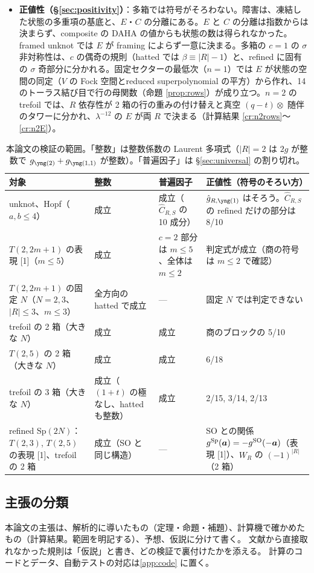 \begin{itemize}
\item \textbf{正値性（§\ref{sec:positivity}）}：多箱では符号がそろわない。障害は、凍結した状態の多重項の基底と、$E$・$C$ の分離にある。$E$ と $C$ の分離は指数からは決まらず、composite の DAHA の値からも状態の数は得られなかった。framed unknot では $E$ が framing によらず一意に決まる。多箱の $c = 1$ の $\sigma$ 非対称性は、$c$ の偶奇の規則（hatted では $\beta \equiv |R| - 1$）と、refined に固有の $\sigma$ 奇部分に分かれる。固定セクターの最低次（$n = 1$）では $E$ が状態の空間の同定（$V$ の Fock 空間とreduced superpolynomial の平方）から作れ、14 のトーラス結び目で行の母関数（命題 \ref{prop:rows}）が成り立つ。$n = 2$ の trefoil では、$R$ 依存性が 2 箱の行の重みの付け替えと真空 $(q-t)\otimes$ 随伴のタワーに分かれ、$\lambda^{-12}$ の $E$ が両 $R$ で決まる（計算結果 \ref{cr:n2rows}〜\ref{cr:n2E}）。
\end{itemize}

\begin{table}[t]
\centering
\small
\caption{本論文の検証の範囲。「整数」は整数係数の Laurent 多項式（$|R| = 2$ は $2g$ が整数で $g_{\ytwo} + g_{\yoneone}$ が整数）。「普遍因子」は §\ref{sec:universal} の割り切れ。}\label{tab:summary}
\begin{tabular}{p{3.6cm}p{2.6cm}p{2.4cm}p{5.4cm}}
\toprule
対象 & 整数 & 普遍因子 & 正値性（符号のそろい方） \\
\midrule
unknot、Hopf（$a, b \le 4$） & 成立 & 成立（$\hat C_{R,S}$ の 10 成分） & $\hat g_{R,\yone}$ はそろう。$\hat C_{R,S}$ の refined だけの部分は 8/10 \\
$T(2,2m+1)$ の表現 [1]（$m \le 5$） & 成立 & $c = 2$ 部分は $m \le 5$、全体は $m \le 2$ & 判定式が成立（商の符号は $m \le 2$ で確認） \\
$T(2,2m+1)$ の固定 $N$（$N = 2, 3$、$|R| \le 3$、$m \le 3$） & 全方向の hatted で成立 & — & 固定 $N$ では判定できない \\
trefoil の 2 箱（大きな $N$） & 成立 & 成立 & 商のブロックの 5/10 \\
$T(2,5)$ の 2 箱（大きな $N$） & 成立 & 成立 & 6/18 \\
trefoil の 3 箱（大きな $N$） & 成立（$(1+t)$ の極なし、hatted も整数） & 成立 & 2/15, 3/14, 2/13 \\
refined Sp$(2N)$：$T(2,3)$, $T(2,5)$ の表現 [1]、trefoil の 2 箱 & 成立（SO と同じ構造） & — & SO との関係 $g^{\mathrm{Sp}}(\bm{a}) = -g^{\mathrm{SO}}(-\bm{a})$（表現 [1]）、$W_R$ の $(-1)^{|R|}$（2 箱） \\
\bottomrule
\end{tabular}
\end{table}

\subsection{主張の分類}
本論文の主張は、解析的に導いたもの（定理・命題・補題）、計算機で確かめたもの（計算結果。範囲を明記する）、予想、仮説に分けて書く。
文献から直接取れなかった規則は「仮説」と書き、どの検証で裏付けたかを添える。
計算のコードとデータ、自動テストの対応は\ref{app:code} に置く。
